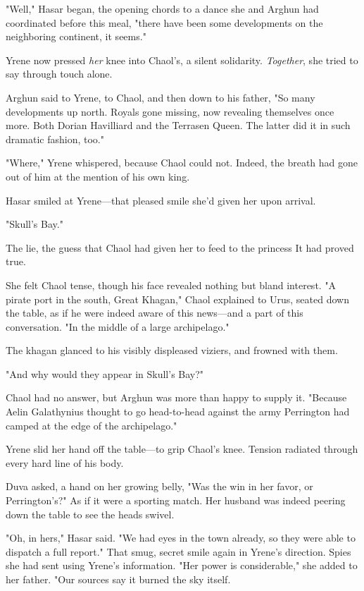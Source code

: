 "Well," Hasar began, the opening chords to a dance she and Arghun had coordinated before this meal, "there have been some 
developments on the neighboring continent, it seems."

Yrene now pressed \emph{her} knee into Chaol's, a silent solidarity.
\emph{Together}, she tried to say through touch alone.

Arghun said to Yrene, to Chaol, and then down to his father, "So many developments up north.
Royals gone missing, now revealing themselves once more.
Both Dorian Havilliard and the Terrasen Queen.
The latter did it in such dramatic fashion, too."

"Where," Yrene whispered, because Chaol could not.
Indeed, the breath had gone out of him at the mention of his own king.

Hasar smiled at Yrene---that pleased smile she'd given her upon arrival.

"Skull's Bay."

The lie, the guess that Chaol had given her to feed to the princess  It had proved true.

She felt Chaol tense, though his face revealed nothing but bland interest.
"A pirate port in the south, Great Khagan," Chaol explained to Urus, seated down the table, as if he were indeed aware of this news---and a part of this conversation.
"In the middle of a large archipelago."

The khagan glanced to his visibly displeased viziers, and frowned with them.

"And why would they appear in Skull's Bay?"

Chaol had no answer, but Arghun was more than happy to supply it.
"Because Aelin Galathynius thought to go head-to-head against the army Perrington had camped at the edge of the archipelago."

Yrene slid her hand off the table---to grip Chaol's knee.
Tension radiated through every hard line of his body.

Duva asked, a hand on her growing belly, "Was the win in her favor, or Perrington's?"
As if it were a sporting match.
Her husband was indeed peering down the table to see the heads swivel.

"Oh, in hers," Hasar said.
"We had eyes in the town already, so they were able to dispatch a full report."
That smug, secret smile again in Yrene's direction.
Spies she had sent using Yrene's information.
"Her power is considerable," she added to her father.
"Our sources say it burned the sky itself.

